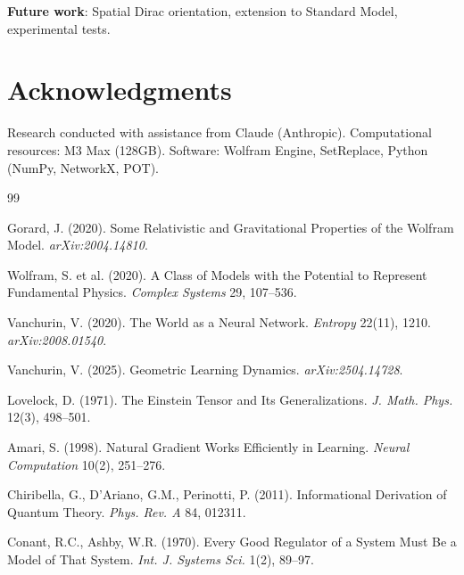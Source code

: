 \documentclass[11pt]{article}
\theoremstyle{definition}
\theoremstyle{remark}
\begin{document}
\textbf{Future work}: Spatial Dirac orientation, extension to Standard Model, experimental tests.

\section*{Acknowledgments}

Research conducted with assistance from Claude (Anthropic). Computational resources: M3 Max (128GB). Software: Wolfram Engine, SetReplace, Python (NumPy, NetworkX, POT).

\begin{thebibliography}{99}

Gorard, J. (2020). Some Relativistic and Gravitational Properties of the Wolfram Model. \textit{arXiv:2004.14810}.

Wolfram, S. et al. (2020). A Class of Models with the Potential to Represent Fundamental Physics. \textit{Complex Systems} 29, 107--536.

Vanchurin, V. (2020). The World as a Neural Network. \textit{Entropy} 22(11), 1210. \textit{arXiv:2008.01540}.

Vanchurin, V. (2025). Geometric Learning Dynamics. \textit{arXiv:2504.14728}.

Lovelock, D. (1971). The Einstein Tensor and Its Generalizations. \textit{J. Math. Phys.} 12(3), 498--501.

Amari, S. (1998). Natural Gradient Works Efficiently in Learning. \textit{Neural Computation} 10(2), 251--276.

Chiribella, G., D'Ariano, G.M., Perinotti, P. (2011). Informational Derivation of Quantum Theory. \textit{Phys. Rev. A} 84, 012311.

Conant, R.C., Ashby, W.R. (1970). Every Good Regulator of a System Must Be a Model of That System. \textit{Int. J. Systems Sci.} 1(2), 89--97.

\end{thebibliography}
\end{document}
